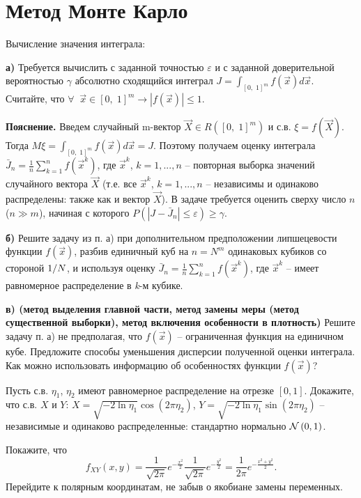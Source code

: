 \section{Метод Монте Карло}

\begin{problem}
Вычисление значения интеграла:

 \textbf{а)} Требуется вычислить с заданной точностью $\varepsilon $ и с заданной доверительной вероятностью $\gamma $ абсолютно сходящийся интеграл $J=\int _{\left[0,\; 1\right]^{m} }f\left(\vec{x}\right)d\vec{x} $. Считайте, что $\forall \; \; \vec{x}\in \left[0,\; 1\right]^{m} \to \left|f\left(\vec{x}\right)\right|\le 1$.

\noindent \textbf{Пояснение. }Введем случайный m-вектор $\vec{X}\in R\left(\left[0,\; 1\right]^{m} \right)$ и с.в. $\xi =f\left(\vec{X}\right)$. Тогда $M\xi =\int _{\left[0,\; 1\right]^{m} }f\left(\vec{x}\right)d\vec{x} =J$. Поэтому получаем оценку интеграла $\bar{J}_{n} =\frac{1}{n} \sum _{k=1}^{n}f\left(\vec{x}^{k} \right) $, где $\vec{x}^{k} $, $k=1,...,n$ -- повторная выборка значений случайного вектора $\vec{X}$ (т.е. все $\vec{x}^{k} $, $k=1,...,n$ -- независимы и одинаково распределены: также как и вектор $\vec{X}$). В задаче требуется оценить сверху число $n$ ($n\gg m$), начиная с которого $P\left(\left|J-\bar{J}_{n} \right|\le \varepsilon \right)\ge \gamma $.

\textbf{б) }Решите задачу из п. а) при дополнительном предположении липшецевости функции $f\left(\vec{x}\right)$, разбив единичный куб на $n=N^{m} $ одинаковых кубиков со стороной ${1\mathord{\left/ {\vphantom {1 N}} \right. \kern-\nulldelimiterspace} N} $, и используя оценку $\bar{J}_{n} =\frac{1}{n} \sum _{k=1}^{n}f\left(\vec{x}^{k} \right) $, где $\vec{x}^{k} $ -- имеет равномерное распределение в \textit{k}-м кубике.

\textbf{в) (метод выделения главной части, метод замены меры (метод существенной выборки), метод включения особенности в плотность) }Решите задачу п. а) не предполагая, что $f\left(\vec{x}\right)$ -- ограниченная функция на единичном кубе. Предложите способы уменьшения дисперсии полученной оценки интеграла. Как можно использовать информацию об особенностях функции $f\left(\vec{x}\right)$?

\end{problem}

\begin{problem}
Пусть с.в. $\eta _{1} $, $\eta _{2} $ имеют равномерное распределение на отрезке $\left[0,1\right]$. Докажите, что с.в. $X$ и $Y$: $X=\sqrt{-2\ln \eta _{1} } \cos \left(2\pi \eta _{2} \right)$, $Y=\sqrt{-2\ln \eta _{1} } \sin \left(2\pi \eta _{2} \right)$ -- независимые и одинаково распределенные: стандартно нормально ${\rm {\mathcal N}}\left(0,1\right)$.

\begin{ordre}
Покажите, что
\[f_{XY} (x,y)=\frac{1}{\sqrt{2\pi } } e^{-\frac{x^{2} }{2} } \frac{1}{\sqrt{2\pi } } e^{-\frac{y^{2} }{2} } =\frac{1}{2\pi } e^{-\frac{x^{2} +y^{2} }{2} } .\] 
Перейдите к полярным координатам, не забыв о якобиане замены переменных.
\end{ordre}

\end{problem}

